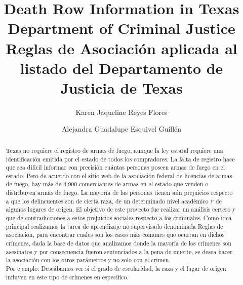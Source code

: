 \documentclass[sigconf]{acmart}
\begin{document}
\title{Death Row Information in Texas Department of Criminal Justice \\ Reglas de Asociación aplicada al listado del Departamento de Justicia de Texas}
\author{Karen Jaqueline Reyes Flores}

\author{Alejandra Guadalupe Esquivel Guillén}
\renewcommand{\shortauthors}{MINERIA DE DATOS}
\renewcommand{\abstractname}{Resumen}
\begin{abstract}
Texas no requiere el registro de armas de fuego, aunque la ley estatal requiere una identificación emitida por el estado de todos los compradores. La falta de registro hace que sea difícil informar con precisión cuántas personas poseen armas de fuego en el estado. Pero de acuerdo con el sitio web de la asociación federal de licencias de armas de fuego, hay más de 4,900 comerciantes de armas en el estado que venden o distribuyen armas de fuego.
La mayoría de las personas tienen aún prejuicios respecto a que los delincuentes son de cierta raza, de un determinado nivel académico y de algunos lugares de origen.
El objetivo de este proyecto fue realizar un análisis certero y que de contradicciones a estos prejuicios sociales respecto a los criminales. Como idea principal realizamos la tarea de aprendizaje no supervisado denominada Reglas de asociación, para encontrar cuales son los casos más comunes que ocurran en dichos crímenes, dada la base de datos que analizamos donde la mayoría de los crímenes son asesinatos y por consecuencia fueron sentenciados a la pena de muerte, se desea hacer la asociación con los otros parámetros y no solo con el crimen. \\Por ejemplo: Deseábamos ver si el grado de escolaridad, la raza y el lugar de origen influyen en este tipo de crímenes en específico.

\end{abstract}

\end{document}
